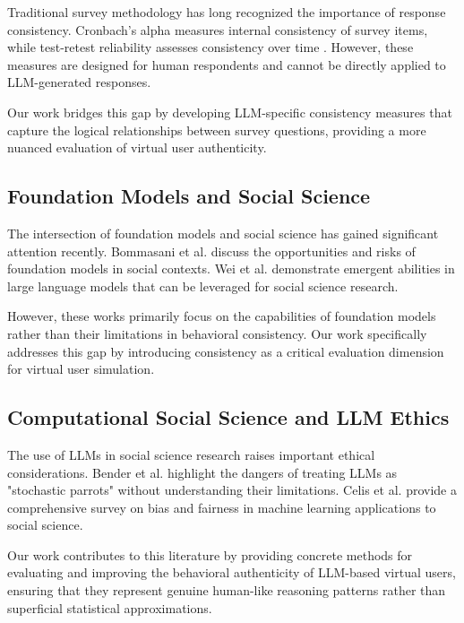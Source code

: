 \documentclass[sigconf, anonymous]{acmart}
\begin{document}
Traditional survey methodology has long recognized the importance of response consistency. Cronbach's alpha \cite{cronbach1951coefficient} measures internal consistency of survey items, while test-retest reliability assesses consistency over time \cite{nunnally1978psychometric}. However, these measures are designed for human respondents and cannot be directly applied to LLM-generated responses.

Our work bridges this gap by developing LLM-specific consistency measures that capture the logical relationships between survey questions, providing a more nuanced evaluation of virtual user authenticity.

\subsection{Foundation Models and Social Science}

The intersection of foundation models and social science has gained significant attention recently. Bommasani et al. \cite{bommasani2021opportunities} discuss the opportunities and risks of foundation models in social contexts. Wei et al. \cite{wei2022emergent} demonstrate emergent abilities in large language models that can be leveraged for social science research.

However, these works primarily focus on the capabilities of foundation models rather than their limitations in behavioral consistency. Our work specifically addresses this gap by introducing consistency as a critical evaluation dimension for virtual user simulation.

\subsection{Computational Social Science and LLM Ethics}

The use of LLMs in social science research raises important ethical considerations. Bender et al. \cite{bender2021dangers} highlight the dangers of treating LLMs as "stochastic parrots" without understanding their limitations. Celis et al. \cite{celis2021survey} provide a comprehensive survey on bias and fairness in machine learning applications to social science.

Our work contributes to this literature by providing concrete methods for evaluating and improving the behavioral authenticity of LLM-based virtual users, ensuring that they represent genuine human-like reasoning patterns rather than superficial statistical approximations.
\end{document}

